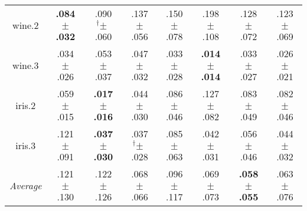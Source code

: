 \begin{tabular}{|c|ccccccc|}
wine.2 & \textbf{.084$^{\phantom{\dag}}\pm^{\phantom{\dag}}$.032}\cellcolor{green!40} & .090$^{\dag}\pm^{\phantom{\dag}}$.060\cellcolor{green!35} & .137$^{\phantom{\dag}}\pm^{\phantom{\dag}}$.056\cellcolor{green!2} & .150$^{\phantom{\dag}}\pm^{\phantom{\dag}}$.078\cellcolor{red!6} & .198$^{\phantom{\dag}}\pm^{\phantom{\dag}}$.108\cellcolor{red!40} & .128$^{\phantom{\dag}}\pm^{\phantom{\dag}}$.072\cellcolor{green!9} & .123$^{\phantom{\dag}}\pm^{\phantom{\dag}}$.069\cellcolor{green!12} \\
wine.3 & .034$^{\phantom{\dag}}\pm^{\phantom{\dag}}$.026\cellcolor{red!1} & .053$^{\phantom{\dag}}\pm^{\phantom{\dag}}$.037\cellcolor{red!40} & .047$^{\phantom{\dag}}\pm^{\phantom{\dag}}$.032\cellcolor{red!29} & .033$^{\phantom{\dag}}\pm^{\phantom{\dag}}$.028\cellcolor{red!0} & \textbf{.014$^{\phantom{\dag}}\pm^{\phantom{\dag}}$.014}\cellcolor{green!40} & .033$^{\phantom{\dag}}\pm^{\phantom{\dag}}$.027\cellcolor{green!1} & .026$^{\phantom{\dag}}\pm^{\phantom{\dag}}$.021\cellcolor{green!13} \\
iris.2 & .059$^{\phantom{\dag}}\pm^{\phantom{\dag}}$.015\cellcolor{green!9} & \textbf{.017$^{\phantom{\dag}}\pm^{\phantom{\dag}}$.016}\cellcolor{green!40} & .044$^{\phantom{\dag}}\pm^{\phantom{\dag}}$.030\cellcolor{green!20} & .086$^{\phantom{\dag}}\pm^{\phantom{\dag}}$.046\cellcolor{red!10} & .127$^{\phantom{\dag}}\pm^{\phantom{\dag}}$.082\cellcolor{red!40} & .083$^{\phantom{\dag}}\pm^{\phantom{\dag}}$.049\cellcolor{red!8} & .082$^{\phantom{\dag}}\pm^{\phantom{\dag}}$.046\cellcolor{red!7} \\
iris.3 & .121$^{\phantom{\dag}}\pm^{\phantom{\dag}}$.091\cellcolor{red!40} & \textbf{.037$^{\phantom{\dag}}\pm^{\phantom{\dag}}$.030}\cellcolor{green!40} & .037$^{\dag}\pm^{\phantom{\dag}}$.028\cellcolor{green!39} & .085$^{\phantom{\dag}}\pm^{\phantom{\dag}}$.063\cellcolor{red!5} & .042$^{\phantom{\dag}}\pm^{\phantom{\dag}}$.031\cellcolor{green!34} & .056$^{\phantom{\dag}}\pm^{\phantom{\dag}}$.046\cellcolor{green!21} & .044$^{\phantom{\dag}}\pm^{\phantom{\dag}}$.032\cellcolor{green!33} \\\hline
\textit{Average} & .121$^{\phantom{\dag}}\pm^{\phantom{\dag}}$.130\cellcolor{red!38} & .122$^{\phantom{\dag}}\pm^{\phantom{\dag}}$.126\cellcolor{red!40} & .068$^{\phantom{\dag}}\pm^{\phantom{\dag}}$.066\cellcolor{green!27} & .096$^{\phantom{\dag}}\pm^{\phantom{\dag}}$.117\cellcolor{red!7} & .069$^{\phantom{\dag}}\pm^{\phantom{\dag}}$.073\cellcolor{green!26} & \textbf{.058$^{\phantom{\dag}}\pm^{\phantom{\dag}}$.055}\cellcolor{green!40} & .063$^{\phantom{\dag}}\pm^{\phantom{\dag}}$.076\cellcolor{green!33} \\\hline
\end{tabular}